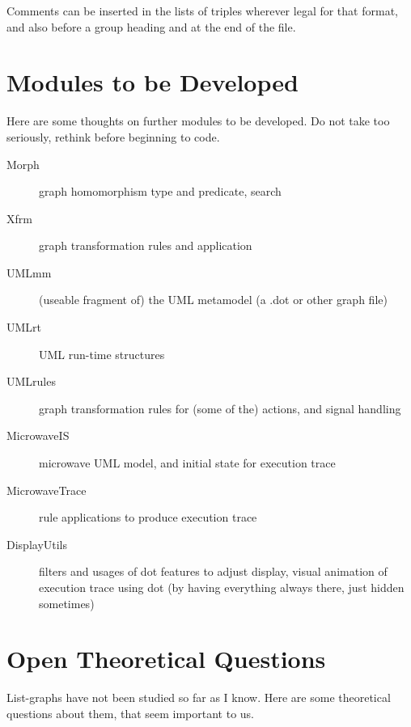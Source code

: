 \documentclass[a4paper]{article}
\begin{document}
Comments can be inserted in the lists of triples wherever legal for
that format, and also before a group heading and at the end of the
file.



% 





% 
%

\section{Modules to be Developed}
\label{development}
Here are some thoughts on further modules to be developed.  Do not
take too seriously, rethink before beginning to code.

\begin{description}
\item[Morph] graph homomorphism type and predicate, search
\item[Xfrm] graph transformation rules and application
\item[UMLmm] (useable fragment of) the UML metamodel (a .dot or other graph file)
\item[UMLrt] UML run-time structures
\item[UMLrules] graph transformation rules for (some of the) actions,
and signal handling
\item[MicrowaveIS] microwave UML model, and initial state for execution trace
\item[MicrowaveTrace] rule applications to produce execution trace
\item[DisplayUtils] filters and usages of dot features to adjust
display, visual animation of execution trace using dot (by having
everything always there, just hidden sometimes)
\end{description}

\section{Open Theoretical Questions}
\label{research}

List-graphs have not been studied so far as I know.  Here are some
theoretical questions about them, that seem important to us.
\end{document}

